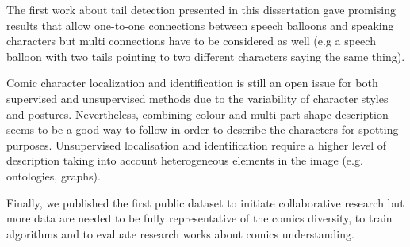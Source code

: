 The first work about tail detection presented in this dissertation gave promising results that allow one-to-one connections between speech balloons and speaking characters but multi connections have to be considered as well (e.g a speech balloon with two tails pointing to two different characters saying the same thing).

Comic character localization and identification is still an open issue for both supervised and unsupervised methods due to the variability of character styles and postures.
Nevertheless, combining colour and multi-part shape description seems to be a good way to follow in order to describe the characters for spotting purposes.
Unsupervised localisation and identification require a higher level of description taking into account heterogeneous elements in the image (e.g. ontologies, graphs).

Finally, we published the first public dataset to initiate collaborative research but more data are needed to be fully representative of the comics diversity, to train algorithms and to evaluate research works about comics understanding.

